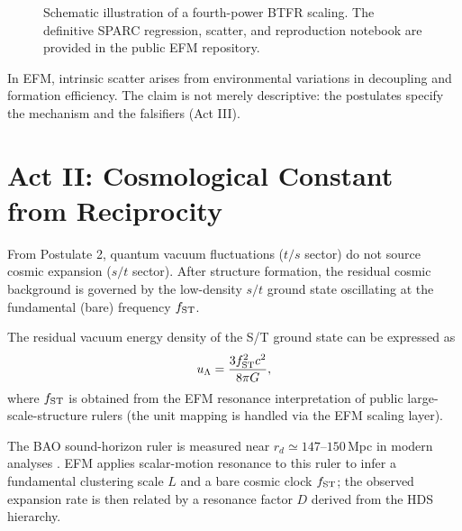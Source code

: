 \documentclass[11pt, twoside]{article}
\begin{document}
\begin{figure}[H]
\centering
{}
\caption{Schematic illustration of a fourth-power BTFR scaling. The definitive SPARC regression, scatter, and reproduction notebook are provided in the public EFM repository.}
\label{fig:btfr}
\end{figure}

In EFM, intrinsic scatter arises from environmental variations in decoupling and formation efficiency. The claim is not merely descriptive: the postulates specify the mechanism and the falsifiers (Act III).

\section{Act II: Cosmological Constant from Reciprocity}
From Postulate 2, quantum vacuum fluctuations ($t/s$ sector) do not source cosmic expansion ($s/t$ sector). After structure formation, the residual cosmic background is governed by the low-density $s/t$ ground state oscillating at the fundamental (bare) frequency $f_{\rm ST}$.

The residual vacuum energy density of the S/T ground state can be expressed as
\[
u_\Lambda = \frac{3 f_{\rm ST}^2 c^2}{8\pi G},
\]
where $f_{\rm ST}$ is obtained from the EFM resonance interpretation of public large-scale-structure rulers (the unit mapping is handled via the EFM scaling layer).

The BAO sound-horizon ruler is measured near $r_d \simeq 147$--$150$\,Mpc in modern analyses \citep{desi2024}. EFM applies scalar-motion resonance to this ruler to infer a fundamental clustering scale $L$ and a bare cosmic clock $f_{\rm ST}$; the observed expansion rate is then related by a resonance factor $D$ derived from the HDS hierarchy.
\end{document}
